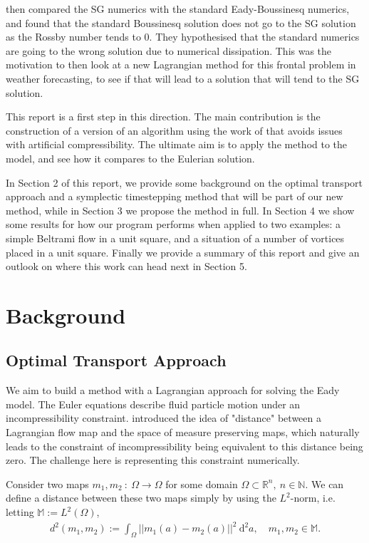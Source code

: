 \documentclass[11pt, oneside]{article}   	%
\newcommand{\R}{\mathbb{R}}
\newcommand{\M}{\mathbb{M}}
\newcommand{\N}{\mathbb{N}}
\begin{document}
\cite{visram2014framework} then compared the SG numerics with the standard Eady-Boussinesq numerics, and found that the standard Boussinesq solution does not go to the SG solution as the Rossby number tends to \(0\). They hypothesised that the standard numerics are going to the wrong solution due to numerical dissipation. This was the motivation to then look at a new Lagrangian method for this frontal problem in weather forecasting, to see if that will lead to a solution that will tend to the SG solution. 

This report is a first step in this direction. The main contribution is the construction of a version of an algorithm using the work of \cite{gallouet2016lagrangian} that avoids issues with artificial compressibility. The ultimate aim is to apply the method to the model, and see how it compares to the Eulerian solution.

In Section 2 of this report, we provide some background on the optimal transport approach and a symplectic timestepping method that will be part of our new method, while in Section 3 we propose the method in full. In Section 4 we show some results for how our program performs when applied to two examples: a simple Beltrami flow in a unit square, and a situation of a number of vortices placed in a unit square. Finally we provide a summary of this report and give an outlook on where this work can head next in Section 5.


\section{Background}

\subsection{Optimal Transport Approach}

We aim to build a method with a Lagrangian approach for solving the Eady model. The Euler equations describe fluid particle motion under an incompressibility constraint. \cite{brenier1989least} introduced the idea of "distance" between a Lagrangian flow map and the space of measure preserving maps, which naturally leads to the constraint of incompressibility being equivalent to this distance being zero. The challenge here is representing this constraint numerically.

Consider two maps \(m_1, m_2 \: : \: \Omega \to \Omega\) for some domain \(\Omega \subset \R^n, \: n \in \N\). We can define a distance between these two maps simply by using the \(L^2\)-norm, i.e. letting \(\M := L^2(\Omega)\), 
\begin{align}
d^2(m_1, m_2) := \int_\Omega || m_1(a) - m_2(a) ||^2 \: \mathrm{d}^2 a, \quad m_1, m_2 \in \M.
\end{align}
\end{document}
